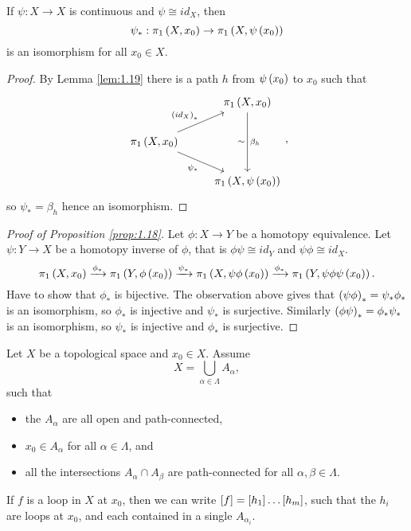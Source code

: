 \begin{corollary}
If $ \psi : X \to X $ is continuous and $ \psi \cong id_X $, then
$$ \psi_* : \pi_1\rb{X, x_0} \to \pi_1\rb{X, \psi\rb{x_0}} $$
is an isomorphism for all $ x_0 \in X $.
\end{corollary}

\begin{proof}
By Lemma \ref{lem:1.19} there is a path $ h $ from $ \psi\rb{x_0} $ to $ x_0 $ such that
$$
\begin{tikzcd}
& \pi_1\rb{X, x_0} \arrow{dd}{\beta_h}[swap]{\sim} \\
\pi_1\rb{X, x_0} \arrow{ur}{\rb{id_X}_*} \arrow[swap]{dr}{\psi_*} & \\
& \pi_1\rb{X, \psi\rb{x_0}}
\end{tikzcd},
$$
so $ \psi_* = \beta_h $ hence an isomorphism.
\end{proof}

\begin{proof}[Proof of Proposition \ref{prop:1.18}]
Let $ \phi : X \to Y $ be a homotopy equivalence. Let $ \psi : Y \to X $ be a homotopy inverse of $ \phi $, that is $ \phi\psi \cong id_Y $ and $ \psi\phi \cong id_X $.
$$ \pi_1\rb{X, x_0} \xrightarrow{\phi_*} \pi_1\rb{Y, \phi\rb{x_0}} \xrightarrow{\psi_*} \pi_1\rb{X, \psi\phi\rb{x_0}} \xrightarrow{\phi_*} \pi_1\rb{Y, \psi\phi\psi\rb{x_0}}. $$
Have to show that $ \phi_* $ is bijective. The observation above gives that $ \rb{\psi\phi}_* = \psi_*\phi_* $ is an isomorphism, so $ \phi_* $ is injective and $ \psi_* $ is surjective. Similarly $ \rb{\phi\psi}_* = \phi_*\psi_* $ is an isomorphism, so $ \psi_* $ is injective and $ \phi_* $ is surjective.
\end{proof}

\begin{lemma}
Let $ X $ be a topological space and $ x_0 \in X $. Assume
$$ X = \bigcup_{\alpha \in \Lambda} A_\alpha, $$
such that
\begin{itemize}
\item the $ A_\alpha $ are all open and path-connected,
\item $ x_0 \in A_\alpha $ for all $ \alpha \in \Lambda $, and
\item all the intersections $ A_\alpha \cap A_\beta $ are path-connected for all $ \alpha, \beta \in \Lambda $.
\end{itemize}
If $ f $ is a loop in $ X $ at $ x_0 $, then we can write $ \sb{f} = \sb{h_1} \dots \sb{h_m} $, such that the $ h_i $ are loops at $ x_0 $, and each contained in a single $ A_{\alpha_i} $.
\end{lemma}

